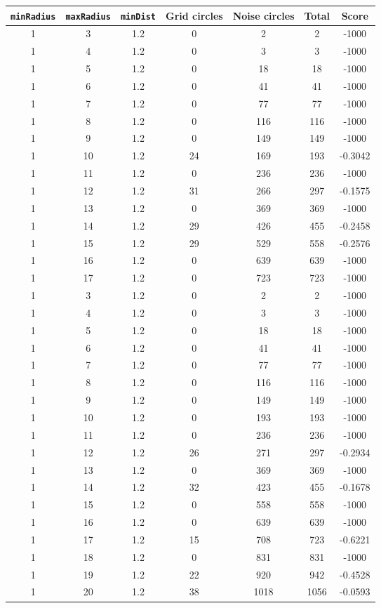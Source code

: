 \documentclass[letterpaper, 12pt]{article}
\begin{document}
\begin{longtable}{|c|c|c|c|c|c|c|}
\hline
\textbf{\texttt{minRadius}} & \textbf{\texttt{maxRadius}} & \textbf{\texttt{minDist}} & \textbf{Grid circles} & \textbf{Noise circles} & \textbf{Total} & \textbf{Score} \\
\hline
1 & 3 & 1.2 & 0 & 2 & 2 & -1000 \\
\hline
1 & 4 & 1.2 & 0 & 3 & 3 & -1000 \\
\hline
1 & 5 & 1.2 & 0 & 18 & 18 & -1000 \\
\hline
1 & 6 & 1.2 & 0 & 41 & 41 & -1000 \\
\hline
1 & 7 & 1.2 & 0 & 77 & 77 & -1000 \\
\hline
1 & 8 & 1.2 & 0 & 116 & 116 & -1000 \\
\hline
1 & 9 & 1.2 & 0 & 149 & 149 & -1000 \\
\hline
1 & 10 & 1.2 & 24 & 169 & 193 & -0.3042 \\
\hline
1 & 11 & 1.2 & 0 & 236 & 236 & -1000 \\
\hline
1 & 12 & 1.2 & 31 & 266 & 297 & -0.1575 \\
\hline
1 & 13 & 1.2 & 0 & 369 & 369 & -1000 \\
\hline
1 & 14 & 1.2 & 29 & 426 & 455 & -0.2458 \\
\hline
1 & 15 & 1.2 & 29 & 529 & 558 & -0.2576 \\
\hline
1 & 16 & 1.2 & 0 & 639 & 639 & -1000 \\
\hline
1 & 17 & 1.2 & 0 & 723 & 723 & -1000 \\
\hline
1 & 3 & 1.2 & 0 & 2 & 2 & -1000 \\
\hline
1 & 4 & 1.2 & 0 & 3 & 3 & -1000 \\
\hline
1 & 5 & 1.2 & 0 & 18 & 18 & -1000 \\
\hline
1 & 6 & 1.2 & 0 & 41 & 41 & -1000 \\
\hline
1 & 7 & 1.2 & 0 & 77 & 77 & -1000 \\
\hline
1 & 8 & 1.2 & 0 & 116 & 116 & -1000 \\
\hline
1 & 9 & 1.2 & 0 & 149 & 149 & -1000 \\
\hline
1 & 10 & 1.2 & 0 & 193 & 193 & -1000 \\
\hline
1 & 11 & 1.2 & 0 & 236 & 236 & -1000 \\
\hline
1 & 12 & 1.2 & 26 & 271 & 297 & -0.2934 \\
\hline
1 & 13 & 1.2 & 0 & 369 & 369 & -1000 \\
\hline
1 & 14 & 1.2 & 32 & 423 & 455 & -0.1678 \\
\hline
1 & 15 & 1.2 & 0 & 558 & 558 & -1000 \\
\hline
1 & 16 & 1.2 & 0 & 639 & 639 & -1000 \\
\hline
1 & 17 & 1.2 & 15 & 708 & 723 & -0.6221 \\
\hline
1 & 18 & 1.2 & 0 & 831 & 831 & -1000 \\
\hline
1 & 19 & 1.2 & 22 & 920 & 942 & -0.4528 \\
\hline
1 & 20 & 1.2 & 38 & 1018 & 1056 & -0.0593 \\
\hline
\end{longtable}
\end{document}
